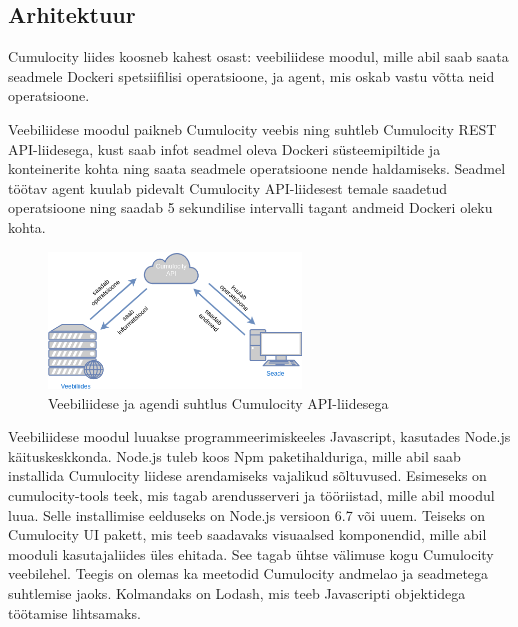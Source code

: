 \documentclass[12pt]{article}
\begin{document}

 \subsection{Arhitektuur}
 Cumulocity liides koosneb kahest osast: veebiliidese moodul, mille abil saab saata seadmele
 Dockeri spetsiifilisi operatsioone, ja agent, mis oskab vastu võtta neid operatsioone.

 Veebiliidese moodul paikneb Cumulocity veebis ning suhtleb Cumulocity REST API-liidesega, kust
 saab infot seadmel oleva Dockeri süsteemipiltide ja konteinerite kohta ning saata
 seadmele operatsioone nende haldamiseks. Seadmel töötav agent kuulab pidevalt Cumulocity
 API-liidesest temale saadetud operatsioone ning saadab 5 sekundilise intervalli tagant
 andmeid Dockeri oleku kohta.

 \begin{figure} [ht] %
 \begin{center}
 \includegraphics[width=0.6\textwidth]{architecture}
 \caption{Veebiliidese ja agendi suhtlus Cumulocity API-liidesega}
 \label{fig:architecture}
 \end{center}
 \end{figure}

 \FloatBarrier

 Veebiliidese moodul luuakse
 programmeerimiskeeles Javascript, kasutades Node.js käituskeskkonda. Node.js tuleb koos
 Npm paketihalduriga, mille abil saab installida Cumulocity liidese arendamiseks vajalikud
 sõltuvused. Esimeseks on cumulocity-tools teek, mis tagab arendusserveri ja tööriistad, mille
 abil moodul luua. Selle installimise eelduseks on Node.js versioon 6.7 või uuem.
 Teiseks on Cumulocity UI pakett, mis teeb saadavaks visuaalsed komponendid,
 mille abil mooduli kasutajaliides üles ehitada. See tagab ühtse välimuse kogu Cumulocity
 veebilehel. Teegis on olemas ka meetodid Cumulocity andmelao ja seadmetega suhtlemise jaoks.
 Kolmandaks on Lodash, mis teeb Javascripti objektidega töötamise lihtsamaks.
\end{document}
